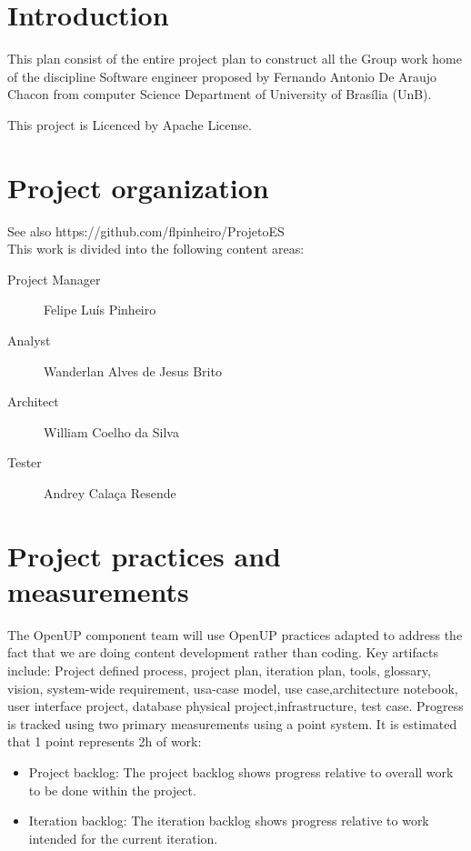 \section*{Introduction}

This plan consist of the entire \gls{project plan} to construct all the Group work home of the  discipline Software engineer proposed by Fernando Antonio De Araujo Chacon from computer Science Department of University of Brasília (UnB).

This project is Licenced by Apache License.

\section*{Project organization}

See also https://github.com/flpinheiro/ProjetoES \\
This work is divided into the following content areas:\\
\begin{description}
	\item[Project Manager] Felipe Luís Pinheiro
	\item[Analyst] Wanderlan Alves de Jesus Brito
	\item[Architect] William Coelho da Silva
	\item[Tester] Andrey Calaça Resende
\end{description}

\section*{Project practices and measurements}

The OpenUP component team will use OpenUP practices adapted to address the fact that we are doing content development rather than coding. Key artifacts include: Project defined process, \gls{project plan}, \gls{iteration} plan, tools, glossary, vision, system-wide \gls{requirement}, usa-case model, use case,\gls{architecture} notebook, user interface  project, database physical project,\gls{infrastructure}, \gls{test case}.
Progress is tracked using two primary measurements using a point system. It is estimated that 1 point represents 2h of work:
\begin{itemize}
	\item Project \gls{backlog}: The project backlog shows progress relative to overall work to be done within the project.
	\item Iteration backlog: The iteration backlog shows progress relative to work intended for the current iteration.
\end{itemize}

